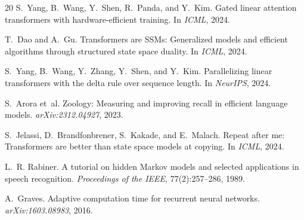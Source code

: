 \documentclass{article}
\theoremstyle{plain}
\theoremstyle{definition}
\begin{document}
\begin{thebibliography}{20}
S.~Yang, B.~Wang, Y.~Shen, R.~Panda, and Y.~Kim.
\newblock Gated linear attention transformers with hardware-efficient training.
\newblock In \emph{ICML}, 2024.

T.~Dao and A.~Gu.
\newblock Transformers are {SSMs}: Generalized models and efficient algorithms
  through structured state space duality.
\newblock In \emph{ICML}, 2024.

S.~Yang, B.~Wang, Y.~Zhang, Y.~Shen, and Y.~Kim.
\newblock Parallelizing linear transformers with the delta rule over sequence
  length.
\newblock In \emph{NeurIPS}, 2024.

S.~Arora et~al.
\newblock Zoology: Measuring and improving recall in efficient language models.
\newblock \emph{arXiv:2312.04927}, 2023.

S.~Jelassi, D.~Brandfonbrener, S.~Kakade, and E.~Malach.
\newblock Repeat after me: Transformers are better than state space models at
  copying.
\newblock In \emph{ICML}, 2024.

L.~R. Rabiner.
\newblock A tutorial on hidden {Markov} models and selected applications in
  speech recognition.
\newblock \emph{Proceedings of the IEEE}, 77(2):257--286, 1989.

A.~Graves.
\newblock Adaptive computation time for recurrent neural networks.
\newblock \emph{arXiv:1603.08983}, 2016.

\end{thebibliography}
\end{document}
